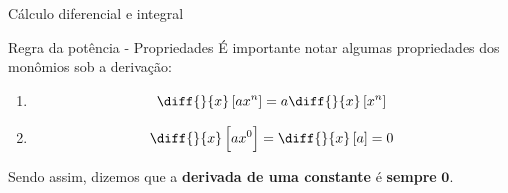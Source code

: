 \begin{frame}{Cálculo diferencial e integral}
	\begin{block}{Regra da potência - Propriedades}
		É importante notar algumas propriedades dos monômios sob a derivação:
		\begin{enumerate}
			\item \[ \diff{}{x}\sbr{ax^{n}}=a\diff{}{x}\sbr{x^{n}} \]
			\item \[ \diff{}{x}\sbr{ax^{0}}=\diff{}{x}\sbr{a}=0 \]
		\end{enumerate}
		Sendo assim, dizemos que a \textbf{derivada de uma constante} é \textbf{sempre} $ \bm{0} $.
	\end{block}
\end{frame}






